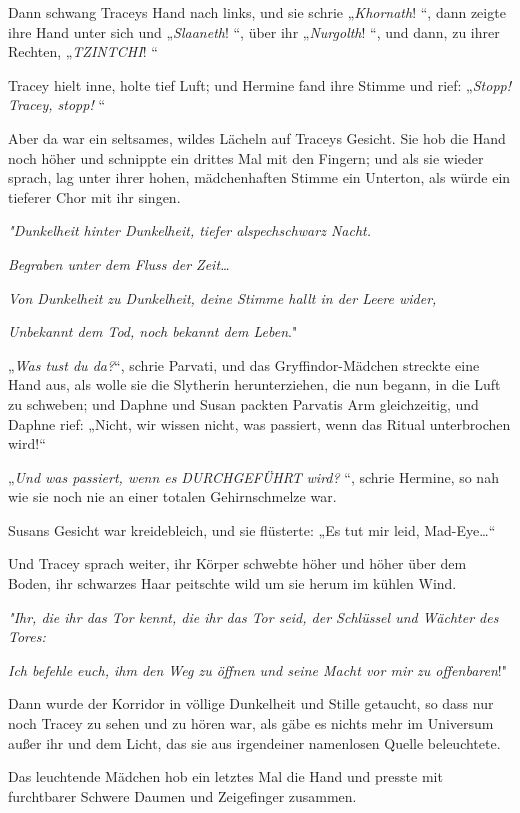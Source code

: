 {Dann schwang Traceys Hand nach links, und sie schrie „\emph{Khornath}! “, dann zeigte ihre Hand unter sich und „\emph{Slaaneth}! “, über ihr „\emph{Nurgolth}! “, und dann, zu ihrer Rechten, „\emph{TZINTCHI}! “

Tracey hielt inne, holte tief Luft; und Hermine fand ihre Stimme und rief: „\emph{Stopp! Tracey, stopp!} “

Aber da war ein seltsames, wildes Lächeln auf Traceys Gesicht. Sie hob die Hand noch höher und schnippte ein drittes Mal mit den Fingern; und als sie wieder sprach, lag unter ihrer hohen, mädchenhaften Stimme ein Unterton, als würde ein tieferer Chor mit ihr singen.

\emph{"\emph{Dunkelheit} \emph{hinter} \emph{Dunkelheit, tiefer alspechschwarz} \emph{Nacht}.}

\emph{Begraben unter dem Fluss der Zeit…}

\emph{Von Dunkelheit zu Dunkelheit, deine Stimme hallt in der Leere wider,}

\emph{Unbekannt dem Tod, noch bekannt dem Leben}."

„\emph{Was tust du da?}“, schrie Parvati, und das Gryffindor-Mädchen streckte eine Hand aus, als wolle sie die Slytherin herunterziehen, die nun begann, in die Luft zu schweben; und Daphne und Susan packten Parvatis Arm gleichzeitig, und Daphne rief: „Nicht, wir wissen nicht, was passiert, wenn das Ritual unterbrochen wird!“

„\emph{Und was passiert, wenn es} \emph{DURCHGEFÜHRT} \emph{wird?} “, schrie Hermine, so nah wie sie noch nie an einer totalen Gehirnschmelze war.

Susans Gesicht war kreidebleich, und sie flüsterte: „Es tut mir leid, Mad-Eye…“

Und Tracey sprach weiter, ihr Körper schwebte höher und höher über dem Boden, ihr schwarzes Haar peitschte wild um sie herum im kühlen Wind.

\emph{"\emph{Ihr, die ihr das Tor kennt, die ihr das Tor seid, der Schlüssel und Wächter des Tores:}}

\emph{Ich befehle euch, ihm den Weg zu öffnen und seine Macht vor mir zu offenbaren}!"

Dann wurde der Korridor in völlige Dunkelheit und Stille getaucht, so dass nur noch Tracey zu sehen und zu hören war, als gäbe es nichts mehr im Universum außer ihr und dem Licht, das sie aus irgendeiner namenlosen Quelle beleuchtete.

Das leuchtende Mädchen hob ein letztes Mal die Hand und presste mit furchtbarer Schwere Daumen und Zeigefinger zusammen.

}
